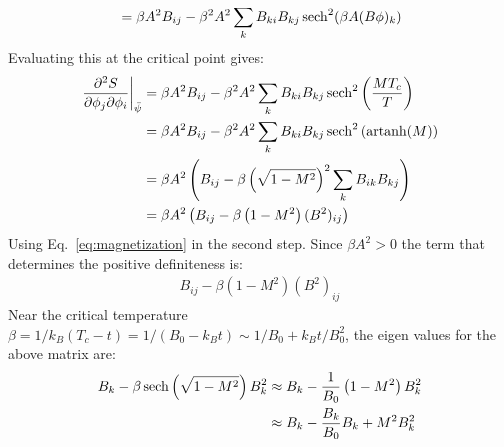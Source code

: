 \documentclass[12pt,a4]{article}
\DeclareMathOperator{\artanh}{artanh}
\begin{document}
\begin{enumerate}
\begin{enumerate}
\begin{align*}
                                            &= \beta A^2  B_{ij}  - \beta^2 A^2 \sum_k B_{ki} B_{kj}\sech^2(\beta A (B \phi)_k)\\
        \end{align*}
        Evaluating this at the critical point gives:
        \begin{align*}
          \left.\frac{\partial^2 S}{\partial \phi_j \partial \phi_i}\right|_{\bar{\psi}} 
                                            &= \beta A^2  B_{ij}  - \beta^2 A^2 \sum_k B_{ki} B_{kj}\sech^2\left(\frac{MT_c}{T}\right)\\
                                            &= \beta A^2  B_{ij}  - \beta^2 A^2 \sum_k B_{ki} B_{kj}\sech^2\left(\artanh(M)\right)\\
                                            &= \beta A^2  \left(B_{ij}  - \beta \left(\sqrt{1 - M^2}\right)^2 \sum_k B_{ik} B_{kj} \right)\\
                                            &= \beta A^2  \left(B_{ij}  - \beta \left(1 - M^2\right) (B^2)_{ij} \right)
        \end{align*}
        Using Eq.~\ref{eq:magnetization} in the second step. 
        Since $\beta A^2 > 0$ the term that determines the positive definiteness is:
        \begin{align*}
          B_{ij}  - \beta \left(1 - M^2\right) (B^2)_{ij}
        \end{align*}
        Near the critical temperature $\beta = 1 / k_B(T_c - t) = 1 / (B_0 - k_B t) \sim 1 / B_0 + k_B t / B_0^2 $, the eigen values for the above matrix are:
        \begin{align*}
          B_{k}  - \beta \sech\left(\sqrt{1 - M^2}\right) B^2_{k} 
                                                                  & \approx B_{k}  - \frac{1}{B_0} \left(1 - M^2\right) B^2_{k}\\
                                                                  & \approx B_{k} - \frac{B_{k}}{B_0}B_{k}  + M^2 B_{k}^2 \\

\end{align*}
\end{enumerate}
\end{enumerate}
\end{document}
